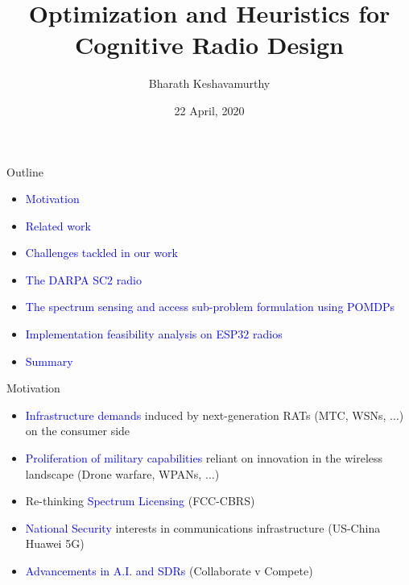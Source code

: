 \documentclass{beamer}
\title[M.S. Dissertation]{Optimization and Heuristics for Cognitive Radio Design}
\author{Bharath Keshavamurthy}
\institute{School of Electrical and Computer Engineering, Purdue University}
\date{22 April, 2020}
\begin{document}
\begin{frame}
  \titlepage
\end{frame}
\begin{frame}{Outline}
  \tableofcontents
  \begin{itemize}
      \item \textcolor{blue}{Motivation}
      \item \textcolor{blue}{Related work}
      \item \textcolor{blue}{Challenges tackled in our work}
      \item \textcolor{blue}{The DARPA SC$2$ radio}
      \item \textcolor{blue}{The spectrum sensing and access sub-problem formulation using POMDPs}
      \item \textcolor{blue}{Implementation feasibility analysis on ESP$32$ radios} 
      \item \textcolor{blue}{Summary}
  \end{itemize}
\end{frame}
\begin{frame}{Motivation}
\begin{itemize}
  \item \textcolor{blue}{Infrastructure demands} induced by next-generation RATs (MTC, WSNs, $\dots$) on the consumer side
  \item \textcolor{blue}{Proliferation of military capabilities} reliant on innovation in the wireless landscape (Drone warfare, WPANs, $\dots$)
  \item Re-thinking \textcolor{blue}{Spectrum Licensing} (FCC-CBRS)
  \item \textcolor{blue}{National Security} interests in communications infrastructure (US-China Huawei 5G)
  \item \textcolor{blue}{Advancements in A.I. and SDRs} (Collaborate v Compete)
\end{itemize}
\end{frame}
\end{document}

